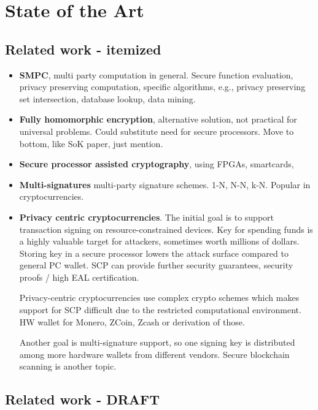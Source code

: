 \documentclass[
  digital, %
  twoside, %
  table,   %
  lof,     %
  lot,     %
]{fithesis3}
\theoremstyle{definition}
\theoremstyle{remark}
\begin{document}
\chapter{State of the Art}%
\begin{ecmmnt}  %
\section{Related work - itemized}
\begin{itemize}
    \item {\bf{SMPC}}, multi party computation in general. Secure function evaluation, privacy preserving computation, specific algorithms, e.g., privacy preserving set intersection, database lookup, data mining. 
    
    \item {\bf{Fully homomorphic encryption}}, alternative solution, not practical for universal problems. Could substitute need for secure processors. Move to bottom, like SoK paper, just mention.
    
    \item {\bf{Secure processor assisted cryptography}}, using FPGAs, smartcards, 
    
    \item {\bf{Multi-signatures}} multi-party signature schemes. 1-N, N-N, k-N. Popular in cryptocurrencies.
    
    \item {\bf{Privacy centric cryptocurrencies}}. The initial goal is to support transaction signing on resource-constrained devices. Key for spending funds is a highly valuable target for attackers, sometimes worth millions of dollars. Storing key in a secure processor lowers the attack surface compared to general PC wallet. SCP can provide further security guarantees, security proofs / high EAL certification. 
    
    Privacy-centric cryptocurrencies use complex crypto schemes which makes support for SCP difficult due to the restricted computational environment. HW wallet for Monero, ZCoin, Zcash or derivation of those. 
    
    Another goal is multi-signature support, so one signing key is distributed among more hardware wallets from different vendors. Secure blockchain scanning is another topic. 
\end{itemize}

\section{Related work - DRAFT}

\end{ecmmnt}
\end{document}
